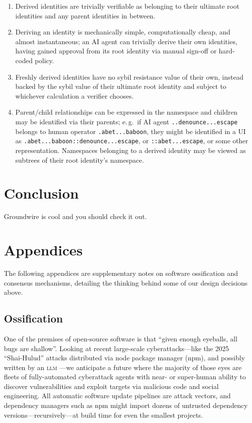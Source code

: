 \documentclass[twoside]{article}
\begin{document}
\begin{enumerate}[noitemsep,topsep=2pt]
\def\labelenumi{\arabic{enumi}.}

\item
  Derived identities are trivially verifiable as belonging to their
  ultimate root identities and any parent identities in between.
\item
  Deriving an identity is mechanically simple, computationally cheap,
  and almost instantaneous; an AI agent can trivially derive their own
  identities, having gained approval from its root identity via manual
  sign-off or hard-coded policy.
\item
  Freshly derived identities have no sybil resistance value of their
  own, instead backed by the sybil value of their ultimate root identity
  and subject to whichever calculation a verifier chooses.
\item
  Parent/child relationships can be expressed in the namespace and
  children may be identified via their parents; e.\,g.\ if AI agent
  \texttt{..denounce...escape} belongs to human operator
  \texttt{.abet...baboon}, they might be identified in a UI as
  \texttt{.abet...baboon::denounce...escape}, or
  \texttt{::abet...escape}, or some other representation. Namespaces
  belonging to a derived identity may be viewed as subtrees of their
  root identity's namespace.
\end{enumerate}

\section{Conclusion}\label{conclusion}

Groundwire is cool and you should check it out.

\section{Appendices}\label{appendices}

The following appendices are supplementary notes on software
ossification and consensus mechanisms, detailing the thinking behind
some of our design decisions above.

\subsection{Ossification}\label{ossification}

One of the premises of open-source software is that ``given enough
eyeballs, all bugs are shallow''. Looking at recent large-scale
cyberattacks---like the 2025 ``Shai-Hulud'' attacks distributed via
node package manager (npm), and possibly written by an \textsc{llm} \citep{Moore2025ShaiHulud}---we anticipate
a future where the majority of those eyes are fleets of fully-automated
cyberattack agents with near- or super-human ability to discover
vulnerabilities and exploit targets via malicious code and social
engineering. All automatic software update pipelines are attack vectors,
and dependency managers such as npm might import dozens of untrusted
dependency versions---recursively---at build time for even the
smallest projects.
\end{document}
